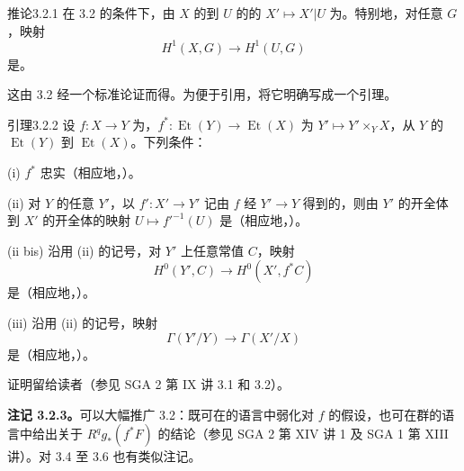 \begin{SGAresult}{推论}{3.2.1}
在 3.2 的条件下，由 $X$ 的到 $U$ 的的 $X'\mapsto X'|U$ 为。特别地，对任意 $G$，映射
\[
H^1(X,G)\longrightarrow H^1(U,G)
\]
是。
\end{SGAresult}
这由 3.2 经一个标准论证而得。为便于引用，将它明确写成一个引理。
\begin{SGAresult}{引理}{3.2.2}
设 $f:X\to Y$ 为，$f^*:\operatorname{Et}(Y)\to\operatorname{Et}(X)$ 为 $Y'\mapsto Y'\times_YX$，从 $Y$ 的 $\operatorname{Et}(Y)$ 到 $\operatorname{Et}(X)$。下列条件：

(i) $f^*$ 忠实（相应地，）。

(ii) 对 $Y$ 的任意 $Y'$，以 $f':X'\to Y'$ 记由 $f$ 经 $Y'\to Y$ 得到的，则由 $Y'$ 的开全体到 $X'$ 的开全体的映射 $U\mapsto f'^{-1}(U)$ 是（相应地，）。

(ii bis) 沿用 (ii) 的记号，对 $Y'$ 上任意常值 $C$，映射
\[
H^0(Y',C)\longrightarrow H^0(X',f^*C)
\]
是（相应地，）。

(iii) 沿用 (ii) 的记号，映射
\[
\Gamma(Y'/Y)\longrightarrow\Gamma(X'/X)
\]
是（相应地，）。
\end{SGAresult}
证明留给读者（参见 SGA 2 第 IX 讲 3.1 和 3.2）。

\textbf{注记 3.2.3。}可以大幅推广 3.2：既可在的语言中弱化对 $f$ 的假设，也可在群的语言中给出关于 $R^qg_*(f^*F)$ 的结论（参见 SGA 2 第 XIV 讲 1 及 SGA 1 第 XIII 讲）。对 3.4 至 3.6 也有类似注记。


